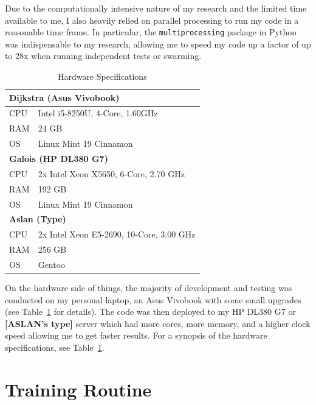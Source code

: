 \documentclass[oneside,12pt,openany]{book}
\begin{document}
	Due to the computationally intensive nature of my research and the limited time available to me, I also heavily relied on parallel processing to run my code in a reasonable time frame. In particular, the \texttt{multiprocessing} package in Python was indispensable to my research, allowing me to speed my code up a factor of up to 28x when running independent tests or swarming.
	
	\begin{table}[!ht]
		\centering
		\begin{tabular}{|l|l|}
			\hline
			\multicolumn{2}{|l|}{\textbf{Dijkstra (Asus Vivobook)}} \\ \hline
			CPU     & Intel i5-8250U, 4-Core, 1.60GHz     \\ \hline
			RAM     & 24 GB                                \\ \hline
			OS      & Linux Mint 19 Cinnamon               \\ \hline
			\multicolumn{2}{|l|}{\textbf{Galois (HP DL380 G7)}}     \\ \hline
			CPU     &  2x Intel Xeon X5650, 6-Core, 2.70 GHz       \\ \hline
			RAM     & 192 GB                               \\ \hline
			OS      & Linux Mint 19 Cinnamon               \\ \hline
			\multicolumn{2}{|l|}{\textbf{Aslan (Type)}}                         \\ \hline
			CPU&    2x  Intel Xeon E5-2690, 10-Core, 3.00 GHz    \\ \hline
			RAM&    256 GB                                  \\ \hline
			OS&    Gentoo                               \\ \hline
		\end{tabular}
		\caption{Hardware Specifications}
		\label{tab:hardware}
	\end{table}

	On the hardware side of things, the majority of development and testing was conducted on my personal laptop, an Asus Vivobook with some small upgrades (see Table~\ref{tab:hardware} for details). The code was then deployed to my HP DL380 G7 or \textbf{[ASLAN's type]} server which had more cores, more memory, and a higher clock speed allowing me to get faster results. For a synopsis of the hardware specifications, see Table~\ref{tab:hardware}. 
	
	\section{Training Routine}\label{sec:exp:train}
	
\end{document}
